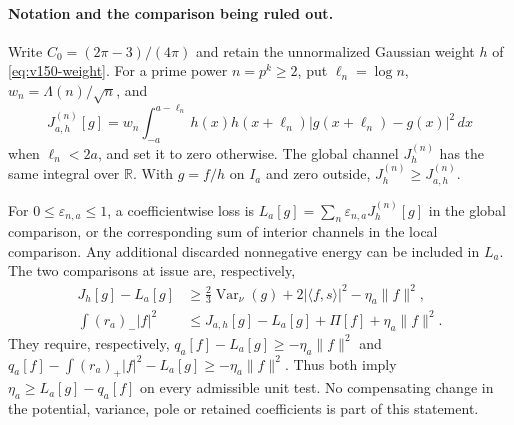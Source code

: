 
\paragraph{Notation and the comparison being ruled out.}
Write $C_0=(2\pi-3)/(4\pi)$ and retain the unnormalized Gaussian weight
$h$ of \eqref{eq:v150-weight}. For a prime power $n=p^k\ge2$, put
$\ell_n=\log n$, $w_n=\Lambda(n)/\sqrt n$, and
\[
 J^{(n)}_{a,h}[g]
 =w_n\int_{-a}^{a-\ell_n}h(x)h(x+\ell_n)
                 |g(x+\ell_n)-g(x)|^2\,dx
\]
when $\ell_n<2a$, and set it to zero otherwise. The global channel
$J^{(n)}_h$ has the same integral over $\mathbb R$. With $g=f/h$ on
$I_a$ and zero outside, $J^{(n)}_h\ge J^{(n)}_{a,h}$.

For $0\le\varepsilon_{n,a}\le1$, a coefficientwise loss is
$L_a[g]=\sum_n\varepsilon_{n,a}J^{(n)}_h[g]$ in the global comparison,
or the corresponding sum of interior channels in the local comparison.
Any additional discarded nonnegative energy can be included in $L_a$.
The two comparisons at issue are, respectively,
\begin{align*}
 J_h[g]-L_a[g]&\ge\tfrac23\operatorname{Var}_\nu(g)
       +2|\langle f,s\rangle|^2-\eta_a\|f\|^2,\\
 \int(r_a)_-|f|^2&\le J_{a,h}[g]-L_a[g]+\Pi[f]
                                  +\eta_a\|f\|^2.
\end{align*}
They require, respectively, $q_a[f]-L_a[g]\ge-\eta_a\|f\|^2$
and $q_a[f]-\int(r_a)_+|f|^2-L_a[g]\ge-\eta_a\|f\|^2$.
Thus both imply $\eta_a\ge L_a[g]-q_a[f]$ on every admissible unit test.
No compensating change in the potential, variance, pole or retained
coefficients is part of this statement.

